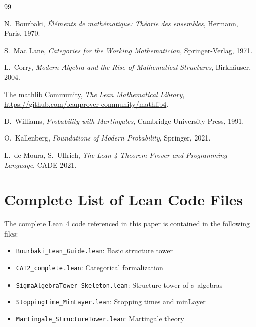 \documentclass[11pt,a4paper]{article}
\theoremstyle{plain}
\theoremstyle{definition}
\begin{document}
\begin{thebibliography}{99}

N.~Bourbaki,
\textit{\'El\'ements de math\'ematique: Th\'eorie des ensembles},
Hermann, Paris, 1970.

S.~Mac Lane,
\textit{Categories for the Working Mathematician},
Springer-Verlag, 1971.

L.~Corry,
\textit{Modern Algebra and the Rise of Mathematical Structures},
Birkh\"auser, 2004.

The mathlib Community,
\textit{The Lean Mathematical Library},
\url{https://github.com/leanprover-community/mathlib4}.

D.~Williams,
\textit{Probability with Martingales},
Cambridge University Press, 1991.

O.~Kallenberg,
\textit{Foundations of Modern Probability},
Springer, 2021.

L.~de Moura, S.~Ullrich,
\textit{The Lean 4 Theorem Prover and Programming Language},
CADE 2021.

\end{thebibliography}

\appendix

\section{Complete List of Lean Code Files}
\label{app:code}

The complete Lean 4 code referenced in this paper is contained in 
the following files:
\begin{itemize}
  \item \texttt{Bourbaki\_Lean\_Guide.lean}: Basic structure tower
  \item \texttt{CAT2\_complete.lean}: Categorical formalization
  \item \texttt{SigmaAlgebraTower\_Skeleton.lean}: Structure tower of $\sigma$-algebras
  \item \texttt{StoppingTime\_MinLayer.lean}: Stopping times and minLayer
  \item \texttt{Martingale\_StructureTower.lean}: Martingale theory
\end{itemize}
\end{document}
